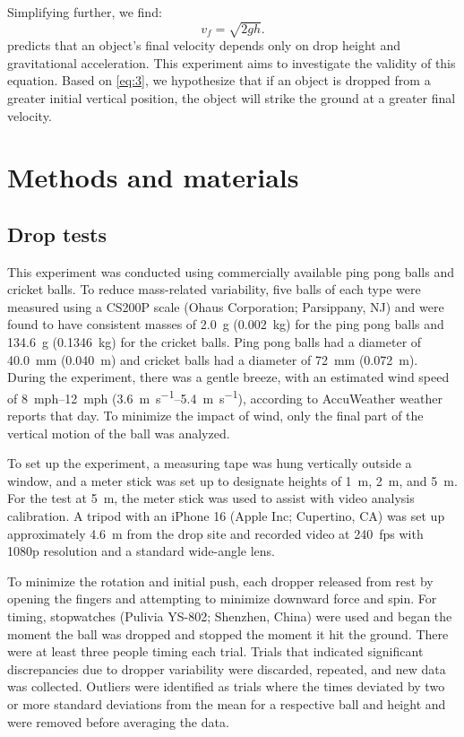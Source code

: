 \documentclass[reprint,amsmath,amssymb,aps,twoside]{revtex4-2}
\begin{document}
Simplifying further, we find:
\begin{equation}
v_f = \sqrt{2gh}.
\label{eq:3}
\end{equation}
 predicts that an object’s final velocity depends only on drop height and gravitational acceleration. This experiment aims to investigate the validity of this equation. Based on \cref{eq:3}, we hypothesize that if an object is dropped from a greater initial vertical position, the object will strike the ground at a greater final velocity. 





\section{Methods and materials}
\subsection{Drop tests}
This experiment was conducted using commercially available ping pong balls and cricket balls. To reduce mass-related variability, five balls of each type were measured using a CS200P scale (Ohaus Corporation; Parsippany, NJ) and were found to have consistent masses of \qty{2.0}{\gram} (\qty{0.002}{\kilo\gram}) for the ping pong balls and \qty{134.6}{\gram} (\qty{0.1346}{\kilo\gram}) for the cricket balls. Ping pong balls had a diameter of \qty{40.0}{\milli\meter} (\qty{0.040}{\meter}) and cricket balls had a diameter of \qty{72}{\milli\meter} (\qty{0.072}{\meter}). During the experiment, there was a gentle breeze, with an estimated wind speed of \qtyrange{8}{12}{mph} (\qtyrange{3.6}{5.4}{\meter\per\second}), according to AccuWeather weather reports that day. To minimize the impact of wind, only the final part of the vertical motion of the ball was analyzed. 

To set up the experiment, a measuring tape was hung vertically outside a window, and a meter stick was set up to designate heights of \qty{1}{\meter}, \qty{2}{\meter}, and \qty{5}{\meter}. For the test at \qty{5}{\meter}, the meter stick was used to assist with video analysis calibration. A tripod with an iPhone 16 (Apple Inc; Cupertino, CA) was set up approximately \qty{4.6}{\meter} from the drop site and recorded video at \qty{240}{fps} with 1080p resolution and a standard wide-angle lens. 

To minimize the rotation and initial push, each dropper released from rest by opening the fingers and attempting to minimize downward force and spin. For timing, stopwatches (Pulivia YS-802; Shenzhen, China) were used and began the moment the ball was dropped and stopped the moment it hit the ground. There were at least three people timing each trial. Trials that indicated significant discrepancies due to dropper variability were discarded, repeated, and new data was collected. Outliers were identified as trials where the times deviated by two or more standard deviations from the mean for a respective ball and height and were removed before averaging the data.
\end{document}
